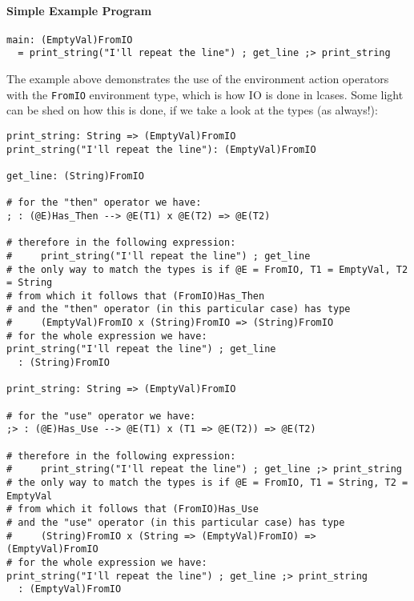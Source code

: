 \documentclass{article}
\begin{document}
\paragraph{Simple Example Program}
\begin{verbatim}
main: (EmptyVal)FromIO
  = print_string("I'll repeat the line") ; get_line ;> print_string
\end{verbatim}
The example above demonstrates the use of the environment action operators with
the \texttt{FromIO} environment type, which is how IO is done in lcases. Some
light can be shed on how this is done, if we take a look at the types (as
always!):
\begin{verbatim}
print_string: String => (EmptyVal)FromIO
print_string("I'll repeat the line"): (EmptyVal)FromIO

get_line: (String)FromIO

# for the "then" operator we have:
; : (@E)Has_Then --> @E(T1) x @E(T2) => @E(T2) 

# therefore in the following expression:
#     print_string("I'll repeat the line") ; get_line
# the only way to match the types is if @E = FromIO, T1 = EmptyVal, T2 = String
# from which it follows that (FromIO)Has_Then
# and the "then" operator (in this particular case) has type
#     (EmptyVal)FromIO x (String)FromIO => (String)FromIO 
# for the whole expression we have:
print_string("I'll repeat the line") ; get_line
  : (String)FromIO

print_string: String => (EmptyVal)FromIO

# for the "use" operator we have:
;> : (@E)Has_Use --> @E(T1) x (T1 => @E(T2)) => @E(T2) 

# therefore in the following expression:
#     print_string("I'll repeat the line") ; get_line ;> print_string
# the only way to match the types is if @E = FromIO, T1 = String, T2 = EmptyVal
# from which it follows that (FromIO)Has_Use
# and the "use" operator (in this particular case) has type
#     (String)FromIO x (String => (EmptyVal)FromIO) => (EmptyVal)FromIO 
# for the whole expression we have:
print_string("I'll repeat the line") ; get_line ;> print_string
  : (EmptyVal)FromIO
\end{verbatim}

\newpage
\end{document}
